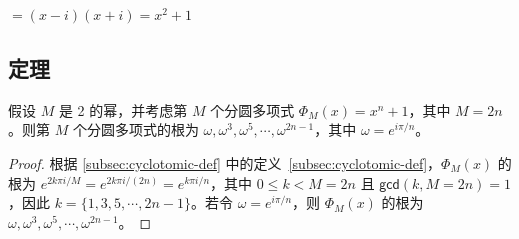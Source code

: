 $= (x - i)(x + i) = x^2 + 1$



\subsection{定理}
\label{subsec:cyclotomic-theorem}


\begin{tcolorbox}[title={\textbf{\tboxtheorem{\ref*{subsec:cyclotomic-theorem}.1} 第 $M$ 个分圆多项式的根}}]

假设 $M$ 是 2 的幂，并考虑第 $M$ 个分圆多项式 $\Phi_M(x) = x^n + 1$，其中 $M = 2n$。则第 $M$ 个分圆多项式的根为 $\omega, \omega^3, \omega^5, \cdots, \omega^{2n-1}$，其中 $\omega = e^{i\pi/n}$。

\end{tcolorbox}

\begin{proof}

根据 \autoref{subsec:cyclotomic-def} 中的定义~\ref*{subsec:cyclotomic-def}，$\Phi_M(x)$ 的根为 $e^{2k\pi i/M} = e^{2k\pi i/(2n)} = e^{k\pi i/n}$，其中 $0 \leq k < M = 2n$ 且 $\textsf{gcd}(k, M = 2n) = 1$，因此 $k = \{1, 3, 5, \cdots, 2n-1\}$。若令 $\omega = e^{i\pi/n}$，则 $\Phi_M(x)$ 的根为 $\omega, \omega^3, \omega^5, \cdots, \omega^{2n-1}$。

\end{proof}

